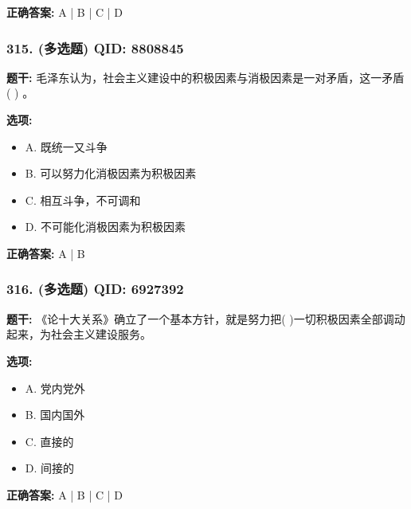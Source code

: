 \documentclass[12pt,UTF8]{ctexart}
\begin{document}
\textbf{正确答案:}
A | B | C | D

\vspace{0.3em}\hrulefill\vspace{0.7em}

\subsubsection*{315. (多选题) \small QID: 8808845}

\textbf{题干:}
毛泽东认为，社会主义建设中的积极因素与消极因素是一对矛盾，这一矛盾 ( ) 。

\textbf{选项:}
\begin{itemize}[leftmargin=*]

  \item A. 既统一又斗争

  \item B. 可以努力化消极因素为积极因素

  \item C. 相互斗争，不可调和

  \item D. 不可能化消极因素为积极因素

\end{itemize}

\textbf{正确答案:}
A | B

\vspace{0.3em}\hrulefill\vspace{0.7em}

\subsubsection*{316. (多选题) \small QID: 6927392}

\textbf{题干:}
《论十大关系》确立了一个基本方针，就是努力把(          )一切积极因素全部调动起来，为社会主义建设服务。

\textbf{选项:}
\begin{itemize}[leftmargin=*]

  \item A. 党内党外

  \item B. 国内国外

  \item C. 直接的

  \item D. 间接的

\end{itemize}

\textbf{正确答案:}
A | B | C | D
\end{document}
